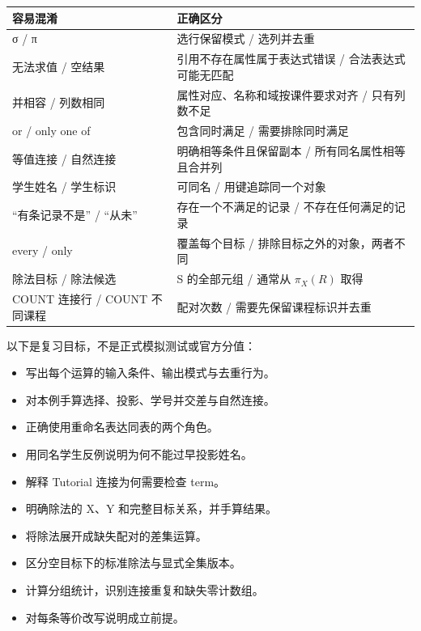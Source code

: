 \begin{longtable}[]{@{}
  >{\raggedright\arraybackslash}p{}
  >{\raggedright\arraybackslash}p{}@{}}
\toprule\noalign{}
\begin{minipage}[b]{\linewidth}\raggedright
容易混淆
\end{minipage} & \begin{minipage}[b]{\linewidth}\raggedright
正确区分
\end{minipage} \\
\midrule\noalign{}
\endhead
\bottomrule\noalign{}
\endlastfoot
σ / π & 选行保留模式 / 选列并去重 \\
无法求值 / 空结果 & 引用不存在属性属于表达式错误 / 合法表达式可能无匹配 \\
并相容 / 列数相同 & 属性对应、名称和域按课件要求对齐 / 只有列数不足 \\
or / only one of & 包含同时满足 / 需要排除同时满足 \\
等值连接 / 自然连接 & 明确相等条件且保留副本 / 所有同名属性相等且合并列 \\
学生姓名 / 学生标识 & 可同名 / 用键追踪同一个对象 \\
``有条记录不是'' / ``从未'' & 存在一个不满足的记录 / 不存在任何满足的记录 \\
every / only & 覆盖每个目标 / 排除目标之外的对象，两者不同 \\
除法目标 / 除法候选 & S 的全部元组 / 通常从 \(\pi _{X}(R)\) 取得 \\
COUNT 连接行 / COUNT 不同课程 & 配对次数 / 需要先保留课程标识并去重 \\
\end{longtable}

以下是复习目标，不是正式模拟测试或官方分值：

\begin{itemize}
\tightlist
\item[$\square$]
  写出每个运算的输入条件、输出模式与去重行为。
\item[$\square$]
  对本例手算选择、投影、学号并交差与自然连接。
\item[$\square$]
  正确使用重命名表达同表的两个角色。
\item[$\square$]
  用同名学生反例说明为何不能过早投影姓名。
\item[$\square$]
  解释 Tutorial 连接为何需要检查 term。
\item[$\square$]
  明确除法的 X、Y 和完整目标关系，并手算结果。
\item[$\square$]
  将除法展开成缺失配对的差集运算。
\item[$\square$]
  区分空目标下的标准除法与显式全集版本。
\item[$\square$]
  计算分组统计，识别连接重复和缺失零计数组。
\item[$\square$]
  对每条等价改写说明成立前提。
\end{itemize}

